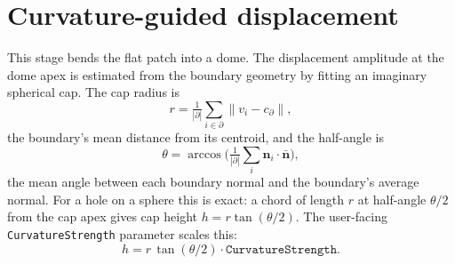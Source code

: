 \section{Curvature-guided displacement}

This stage bends the flat patch into a dome. The displacement amplitude at the dome apex is estimated from the boundary geometry by fitting an imaginary spherical cap. The cap radius is
\begin{equation}
r = \tfrac{1}{|\partial|} \sum_{i \in \partial} \|v_i - c_\partial\|,
\end{equation}
the boundary's mean distance from its centroid, and the half-angle is
\begin{equation}
\theta = \arccos\Big( \tfrac{1}{|\partial|} \sum_{i} \mathbf{n}_i \cdot \bar{\mathbf{n}} \Big),
\end{equation}
the mean angle between each boundary normal and the boundary's average normal. For a hole on a sphere this is exact: a chord of length $r$ at half-angle $\theta/2$ from the cap apex gives cap height $h = r \tan(\theta/2)$. The user-facing \texttt{CurvatureStrength} parameter scales this:
\begin{equation}
h = r \, \tan(\theta/2) \cdot \texttt{CurvatureStrength}. \label{eq:cap-height}
\end{equation}

